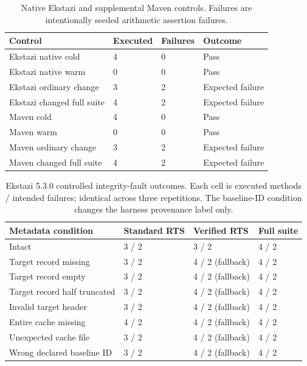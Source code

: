 
\begin{table}[t]
\centering
\small
\caption{Native Ekstazi and supplemental Maven controls. Failures are intentionally seeded arithmetic assertion failures.}
\label{tab:ekstazi-controls}
\begin{tabular}{llll}
\toprule
Control & Executed & Failures & Outcome \\
\midrule
Ekstazi native cold & 4 & 0 & Pass \\
Ekstazi native warm & 0 & 0 & Pass \\
Ekstazi ordinary change & 3 & 2 & Expected failure \\
Ekstazi changed full suite & 4 & 2 & Expected failure \\
Maven cold & 4 & 0 & Pass \\
Maven warm & 0 & 0 & Pass \\
Maven ordinary change & 3 & 2 & Expected failure \\
Maven changed full suite & 4 & 2 & Expected failure \\
\bottomrule
\end{tabular}
\end{table}
\begin{table}[t]
\centering
\small
\caption{Ekstazi 5.3.0 controlled integrity-fault outcomes. Each cell is executed methods / intended failures; identical across three repetitions. The baseline-ID condition changes the harness provenance label only.}
\label{tab:ekstazi-faults}
\begin{tabular}{llll}
\toprule
Metadata condition & Standard RTS & Verified RTS & Full suite \\
\midrule
Intact & 3 / 2 & 3 / 2 & 4 / 2 \\
Target record missing & 3 / 2 & 4 / 2 (fallback) & 4 / 2 \\
Target record empty & 3 / 2 & 4 / 2 (fallback) & 4 / 2 \\
Target record half truncated & 3 / 2 & 4 / 2 (fallback) & 4 / 2 \\
Invalid target header & 3 / 2 & 4 / 2 (fallback) & 4 / 2 \\
Entire cache missing & 4 / 2 & 4 / 2 (fallback) & 4 / 2 \\
Unexpected cache file & 3 / 2 & 4 / 2 (fallback) & 4 / 2 \\
Wrong declared baseline ID & 3 / 2 & 4 / 2 (fallback) & 4 / 2 \\
\bottomrule
\end{tabular}
\end{table}
